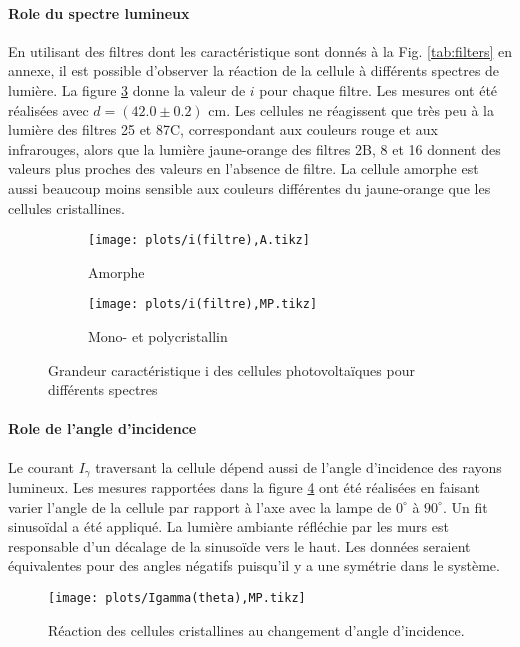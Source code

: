 \paragraph*{Role du spectre lumineux}
En utilisant des filtres dont les caractéristique sont donnés à la Fig. \ref{tab:filters} en annexe, il est possible d'observer la réaction de la cellule à différents spectres de lumière. La figure \ref{plot:6} donne la valeur de \(i\) pour chaque filtre. Les mesures ont été réalisées avec \(d = (42.0 \pm 0.2)\) \unit{\centi\meter}. Les cellules ne réagissent que très peu à la lumière des filtres 25 et 87C, correspondant aux couleurs rouge et aux infrarouges, alors que la lumière jaune-orange des filtres 2B, 8 et 16 donnent des valeurs plus proches des valeurs en l'absence de filtre. La cellule amorphe est aussi beaucoup moins sensible aux couleurs différentes du jaune-orange que les cellules cristallines.

\begin{figure}[H]
    \centering
    \begin{subfigure}[t]{0.48\linewidth}
        \centering
        \texttt{[image: plots/i(filtre),A.tikz]}
        \caption{Amorphe}
        \label{plot:6a}
    \end{subfigure}
    \begin{subfigure}[t]{0.48\linewidth}
        \centering
        \texttt{[image: plots/i(filtre),MP.tikz]}
        \caption{Mono- et polycristallin}
        \label{plot:6b}
    \end{subfigure}
    \caption{Grandeur caractéristique i des cellules photovoltaïques pour différents spectres}
    \label{plot:6}
\end{figure}

\paragraph*{Role de l'angle d'incidence}
Le courant \(I_\gamma\) traversant la cellule dépend aussi de l'angle d'incidence des rayons lumineux. Les mesures rapportées dans la figure \ref{plot:7} ont été réalisées en faisant varier l'angle de la cellule par rapport à l'axe avec la lampe de \(0^{\circ}\) à \(90^{\circ}\). Un fit sinusoïdal a été appliqué. La lumière ambiante réfléchie par les murs est responsable d'un décalage de la sinusoïde vers le haut. Les données seraient équivalentes pour des angles négatifs puisqu'il y a une symétrie dans le système.

\begin{figure}[H]
    \centering
    \texttt{[image: plots/Igamma(theta),MP.tikz]}
    \caption{Réaction des cellules cristallines au changement d'angle d'incidence.}
    \label{plot:7}
\end{figure}



